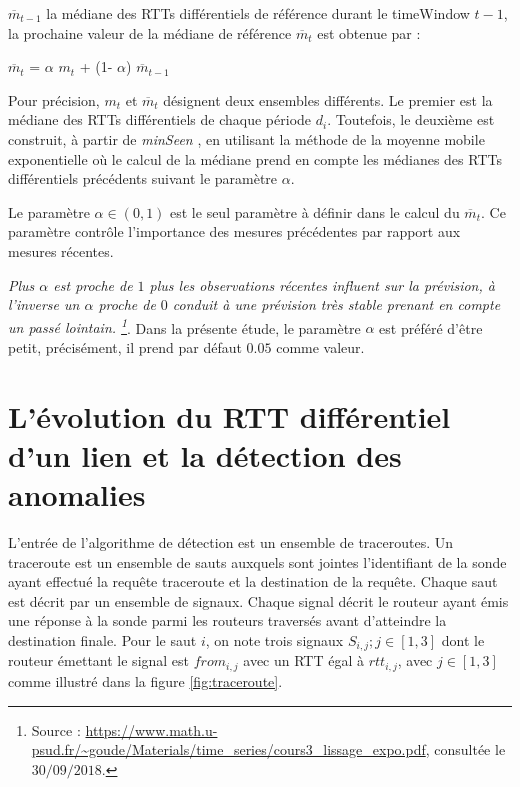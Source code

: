 $ \overline{m}_{t-1}$  la médiane des  RTTs différentiels  de référence durant le timeWindow $ t-1 $,  la prochaine  valeur de la médiane de référence $ \overline{m}_{t}$ est obtenue par : 

\begin{center}
	$ \overline{m}_{t}$ =  $\alpha$ ${m}_{t}$ + (1-  $\alpha$) $ \overline{m}_{t-1}$
\end{center}
Pour précision, $m_t$ et $ \overline{m}_{t}$ désignent deux ensembles différents. Le premier est la médiane des RTTs différentiels de chaque période $d_i$. Toutefois, le deuxième est construit, à partir de \textit{minSeen} , en utilisant la méthode de la moyenne mobile exponentielle où le calcul de la médiane prend en compte les médianes des RTTs différentiels précédents suivant le paramètre $\alpha$.

Le paramètre  $\alpha \in (0, 1)$ est le seul paramètre à définir dans le calcul du $ \overline{m}_{t}$.  Ce paramètre contrôle l'importance  des mesures précédentes par rapport aux mesures récentes.

\guillemotleft \textit{Plus $\alpha$ est proche de $ 1 $ plus les observations récentes influent sur la prévision, à l'inverse un $\alpha$ proche de $0$ conduit à une prévision très stable prenant en compte un passé lointain. \footnote{Source : \url{https://www.math.u-psud.fr/~goude/Materials/time_series/cours3_lissage_expo.pdf}, consultée le $30/09/2018$.}}\guillemotright.  Dans la présente étude, le paramètre $\alpha$ est préféré d'être petit, précisément, il prend par défaut $0.05$ comme valeur.


\section{L'évolution du RTT différentiel d'un lien et  la détection des anomalies} \label{rttevolution}


L'entrée de l'algorithme de détection est un ensemble de traceroutes. Un traceroute  est un ensemble de sauts auxquels sont jointes l'identifiant de la sonde ayant effectué la requête traceroute et la destination de la requête. Chaque saut est décrit par un ensemble de signaux.  Chaque signal décrit le routeur ayant émis une réponse à la sonde parmi les routeurs traversés avant d'atteindre la destination finale.  Pour le saut $i$, on note trois signaux $S_{i, j}; j\in [1,3]$ dont le routeur émettant le signal est $from_{i,j}$ avec un RTT égal à $rtt_{i,j}$, avec $j \in [1,3]$ comme illustré dans la figure \ref{fig:traceroute}.

